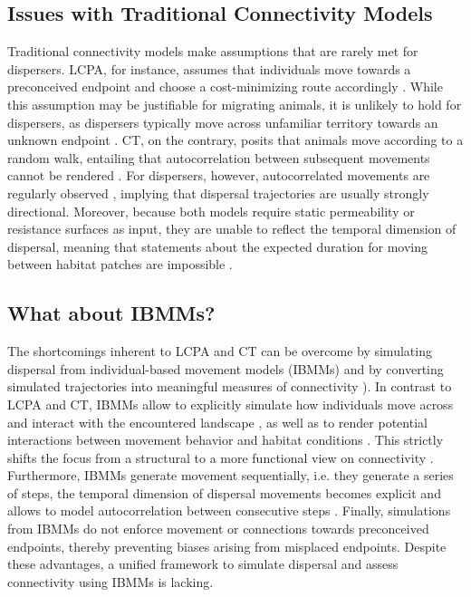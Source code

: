 \documentclass[abstract=on,10pt,a4paper,bibliography=totocnumbered]{article}
\begin{document}
\subsection{Issues with Traditional Connectivity Models}
Traditional connectivity models make assumptions that are rarely met for
dispersers. LCPA, for instance, assumes that individuals move towards a
preconceived endpoint and choose a cost-minimizing route accordingly
\citep{Sawyer.2011, Abrahms.2017}. While this assumption may be justifiable for
migrating animals, it is unlikely to hold for dispersers, as dispersers
typically move across unfamiliar territory towards an unknown endpoint
\citep{Koen.2014, Cozzi.2020}. CT, on the contrary, posits that animals move
according to a random walk, entailing that autocorrelation between subsequent
movements cannot be rendered \citep{Diniz.2019}. For dispersers, however,
autocorrelated movements are regularly observed \citep{Cozzi.2020,
Hofmann.2021}, implying that dispersal trajectories are usually strongly
directional. Moreover, because both models require static permeability or
resistance surfaces as input, they are unable to reflect the temporal dimension
of dispersal, meaning that statements about the expected duration for moving
between habitat patches are impossible \citep{Martensen.2017, Diniz.2019}.

\subsection{What about IBMMs?}
The shortcomings inherent to LCPA and CT can be overcome by simulating dispersal
from individual-based movement models (IBMMs) and by converting simulated
trajectories into meaningful measures of connectivity \citep{Diniz.2019}). In
contrast to LCPA and CT, IBMMs allow to explicitly simulate how individuals move
across and interact with the encountered landscape \citep{Kanagaraj.2013,
Clark.2015, Allen.2016, Hauenstein.2019, Zeller.2020}, as well as to render
potential interactions between movement behavior and habitat conditions
\citep{Avgar.2016}. This strictly shifts the focus from a structural to a more
functional view on connectivity \citep{Tischendorf.2000, Kanagaraj.2013,
Hauenstein.2019}. Furthermore, IBMMs generate movement sequentially, i.e. they
generate a series of steps, the temporal dimension of dispersal movements
becomes explicit and allows to model autocorrelation between consecutive steps
\citep{Diniz.2019}. Finally, simulations from IBMMs do not enforce movement or
connections towards preconceived endpoints, thereby preventing biases arising
from misplaced endpoints. Despite these advantages, a unified framework to
simulate dispersal and assess connectivity using IBMMs is lacking.
\end{document}
